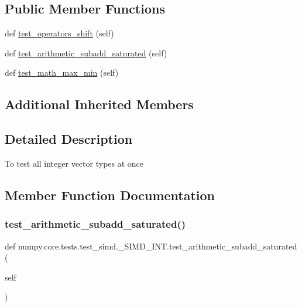 \subsection*{Public Member Functions}
\begin{DoxyCompactItemize}
\item 
def \hyperlink{classnumpy_1_1core_1_1tests_1_1test__simd_1_1__SIMD__INT_a4a17cdb4856b4262e115a2d26169848a}{test\+\_\+operators\+\_\+shift} (self)
\item 
def \hyperlink{classnumpy_1_1core_1_1tests_1_1test__simd_1_1__SIMD__INT_a6724489b8d870a0459f74d6e822dbc25}{test\+\_\+arithmetic\+\_\+subadd\+\_\+saturated} (self)
\item 
def \hyperlink{classnumpy_1_1core_1_1tests_1_1test__simd_1_1__SIMD__INT_afefd7630f804939924d9dad133c2a0c7}{test\+\_\+math\+\_\+max\+\_\+min} (self)
\end{DoxyCompactItemize}
\subsection*{Additional Inherited Members}


\subsection{Detailed Description}
\begin{DoxyVerb}To test all integer vector types at once
\end{DoxyVerb}
 

\subsection{Member Function Documentation}
\mbox{\label{classnumpy_1_1core_1_1tests_1_1test__simd_1_1__SIMD__INT_a6724489b8d870a0459f74d6e822dbc25}} 
\subsubsection{\texorpdfstring{test\+\_\+arithmetic\+\_\+subadd\+\_\+saturated()}{test\_arithmetic\_subadd\_saturated()}}
{\footnotesize\ttfamily def numpy.\+core.\+tests.\+test\+\_\+simd.\+\_\+\+S\+I\+M\+D\+\_\+\+I\+N\+T.\+test\+\_\+arithmetic\+\_\+subadd\+\_\+saturated (\begin{DoxyParamCaption}\item[{}]{self }\end{DoxyParamCaption})}

